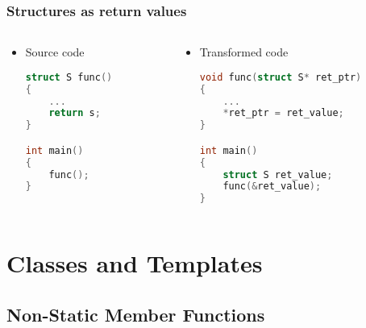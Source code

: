 \documentclass{beamer}
\begin{document}
\begin{frame}[fragile]
    \frametitle{Structures as return values}

    \begin{columns}
        \begin{column}[]{0.4\textwidth}
            \begin{itemize}
                \item Source code
                      \begin{lstlisting}[language=C]
struct S func()
{
    ...
    return s;
}

int main()
{
    func();
}
                    \end{lstlisting}
            \end{itemize}

        \end{column}

        \begin{column}[]{0.7\textwidth}
            \begin{itemize}
                \item Transformed code
                      \begin{lstlisting}[language=C]
void func(struct S* ret_ptr)
{
    ...
    *ret_ptr = ret_value;
}

int main()
{
    struct S ret_value;
    func(&ret_value);
}
                \end{lstlisting}
            \end{itemize}
        \end{column}
    \end{columns}

\end{frame}

\section{Classes and Templates}

\subsection{Non-Static Member Functions}
\end{document}
